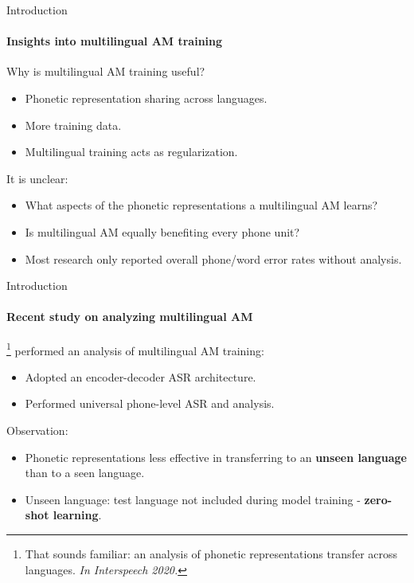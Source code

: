 \documentclass{beamer}
\begin{document}
\begin{frame}{Introduction}
\framesubtitle{Insights into multilingual AM training}
    Why is multilingual AM training useful?
    \begin{itemize}
        \item Phonetic representation sharing across languages.
        \item More training data.
        \item Multilingual training acts as regularization.
    \end{itemize}
    It is unclear: 
    \begin{itemize}
        \item What aspects of the phonetic representations a multilingual AM learns?
        \item Is multilingual AM equally benefiting every phone unit?
        \item  Most  research only reported  overall phone/word error rates without analysis.
    \end{itemize}
   
\end{frame}
\begin{frame}{Introduction}
\framesubtitle{Recent study on analyzing multilingual AM}
\cite{Zelasko2020That_interspeech}\footnote{That sounds familiar: an analysis of phonetic representations transfer across languages. \textit{In Interspeech 2020.}}  performed an analysis of multilingual AM training:
\begin{itemize}
    \item Adopted an encoder-decoder ASR architecture.
    \item Performed  universal phone-level ASR and   analysis.
\end{itemize}
Observation:
\begin{itemize}
    \item Phonetic representations less effective in transferring to an \textbf{unseen language} than to  a seen language.
    \item Unseen language: test language not included during model training - \textbf{zero-shot learning}.
\end{itemize}

\end{frame}
\end{document}
